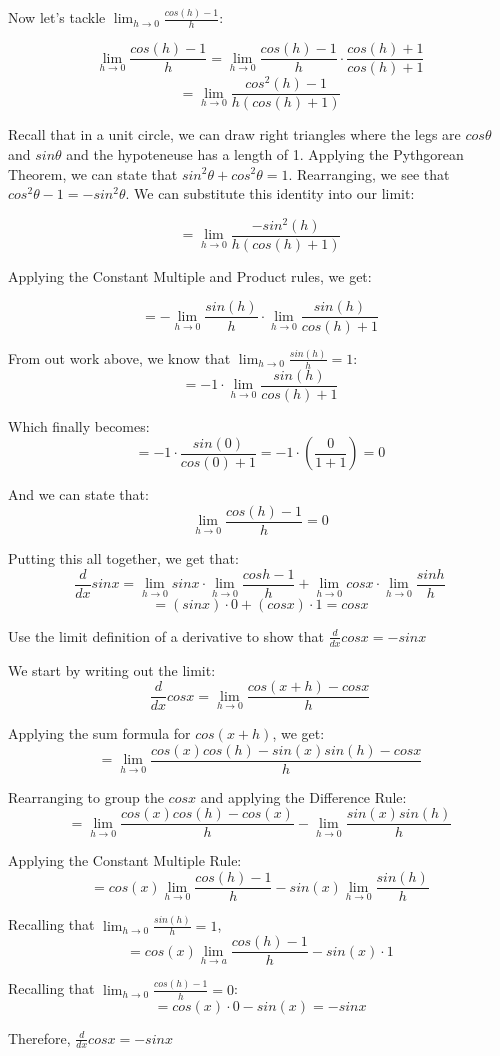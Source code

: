 Now let's tackle $\lim_{h \to 0}\frac{cos(h)-1}{h}$:

$$\lim_{h \to 0}\frac{cos(h)-1}{h} = \lim_{h \to 0}\frac{cos(h)-1}{h} \cdot \frac{cos(h) +1}{cos(h)+1}$$
$$=\lim_{h \to 0}\frac{cos^2(h)-1}{h(cos(h)+1)}$$

Recall that in a unit circle, we can draw right triangles where the legs are $cos\theta$ and $sin\theta$ and the hypoteneuse has a length of 1. Applying the Pythgorean Theorem, we can state that $sin^2\theta+cos^2\theta=1$. Rearranging, we see that $cos^2\theta - 1 = -sin^2\theta$. We can substitute this identity into our limit:

$$=\lim_{h \to 0}\frac{-sin^2(h)}{h(cos(h)+1)}$$

Applying the Constant Multiple and Product rules, we get:

$$=-\lim_{h \to 0}\frac{sin(h)}{h}\cdot \lim_{h \to 0}\frac{sin(h)}{cos(h)+1}$$

From out work above, we know that $\lim_{h \to 0}\frac{sin(h)}{h}=1$:
$$=-1\cdot \lim_{h \to 0}\frac{sin(h)}{cos(h)+1}$$

Which finally becomes:
$$=-1\cdot\frac{sin(0)}{cos(0)+1}=-1 \cdot (\frac{0}{1+1})=0$$

And we can state that:
$$\lim_{h \to 0}\frac{cos(h)-1}{h}=0$$

Putting this all together, we get that:
$$\frac{d}{dx}sinx=\lim_{h \to 0}sinx \cdot \lim_{h \to 0}\frac{cosh-1}{h}+\lim_{h \to 0}cosx \cdot \lim_{h \to 0}\frac{sinh}{h}$$
$$=(sinx)\cdot 0 + (cosx)\cdot1=cosx$$

\begin{Exercise}
    [title=Derivatives of Trig Functions Practice 1, label=trigderiv1]
    Use the limit definition of a derivative to show that $\frac{d}{dx}cosx=-sinx$
\end{Exercise}
\begin{Answer}
    [ref=trigderiv1]
    We start by writing out the limit: $$\frac{d}{dx}cosx=\lim_{h \to 0}\frac{cos(x+h)-cosx}{h}$$

    Applying the sum formula for $cos(x+h)$, we get:
    $$=\lim_{h \to 0}\frac{cos(x)cos(h)-sin(x)sin(h)-cosx}{h}$$

    Rearranging to group the $cosx$ and applying the Difference Rule:
    $$=\lim_{h \to 0}\frac{cos(x)cos(h)-cos(x)}{h} - \lim_{h \to 0}\frac{sin(x)sin(h)}{h}$$

    Applying the Constant Multiple Rule:
    $$=cos(x)\lim_{h \to 0}\frac{cos(h)-1}{h} - sin(x)\lim_{h \to 0}\frac{sin(h)}{h}$$

    Recalling that $\lim_{h \to 0}\frac{sin(h)}{h} = 1$,
    $$=cos(x)\lim_{h \to a}\frac{cos(h)-1}{h}-sin(x) \cdot 1$$

    Recalling that $\lim_{h \to 0}\frac{cos(h)-1}{h}=0$:
    $$=cos(x) \cdot0 -sin(x) = -sinx$$

    Therefore, $\frac{d}{dx}cosx=-sinx$
\end{Answer}

